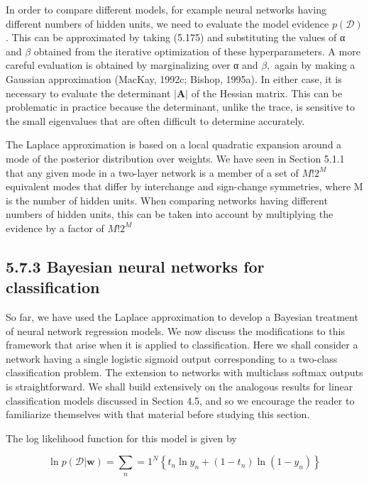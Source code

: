 \documentclass[
  10
]{article}
\begin{document}
In order to compare different models, for example neural networks having
different numbers of hidden units, we need to evaluate the model
evidence \(p ( \mathcal { D } )\) . This can be approximated by taking
(5.175) and substituting the values of α and \(\beta\) obtained from the
iterative optimization of these hyperparameters. A more careful
evaluation is obtained by marginalizing over α and \(\beta ,\) again by
making a Gaussian approximation (MacKay, 1992c; Bishop, 1995a). In
either case, it is necessary to evaluate the determinant
\(| \mathbf { A } |\) of the Hessian matrix. This can be problematic in
practice because the determinant, unlike the trace, is sensitive to the
small eigenvalues that are often difficult to determine accurately.

The Laplace approximation is based on a local quadratic expansion around
a mode of the posterior distribution over weights. We have seen in
Section 5.1.1 that any given mode in a two-layer network is a member of
a set of \(M ! 2 ^ { M }\) equivalent modes that differ by interchange
and sign-change symmetries, where M is the number of hidden units. When
comparing networks having different numbers of hidden units, this can be
taken into account by multiplying the evidence by a factor of
\(M ! 2 ^ { M }\)

\subsection{5.7.3 Bayesian neural networks for
classification}\label{bayesian-neural-networks-for-classification}

So far, we have used the Laplace approximation to develop a Bayesian
treatment of neural network regression models. We now discuss the
modifications to this framework that arise when it is applied to
classification. Here we shall consider a network having a single
logistic sigmoid output corresponding to a two-class classification
problem. The extension to networks with multiclass softmax outputs is
straightforward. We shall build extensively on the analogous results for
linear classification models discussed in Section 4.5, and so we
encourage the reader to familiarize themselves with that material before
studying this section.

The log likelihood function for this model is given by

\[
\ln p (\mathcal {D} | \mathbf {w}) = \sum_ {n} = 1 ^ {N} \left\{t _ {n} \ln y _ {n} + (1 - t _ {n}) \ln (1 - y _ {n}) \right\}\tag{5.181}
\]
\end{document}

